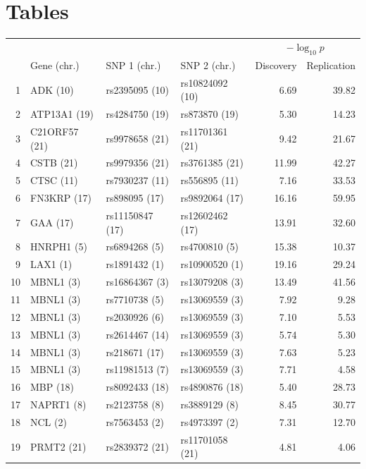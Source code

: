 \documentclass{article}
\begin{document}
\clearpage
\section{Tables}

\begin{table}[ht]
\centering
\begin{tabular}{rlllrr}
  \hline
 & & & & \multicolumn{2}{c}{$-\log_{10} p$} \\
 & Gene (chr.) & SNP 1 (chr.) & SNP 2 (chr.) & Discovery & Replication \\
  \hline
1 & ADK (10)  & rs2395095 (10)  & rs10824092 (10)  & 6.69 & 39.82 \\
  2 & ATP13A1 (19)  & rs4284750 (19)  & rs873870 (19)  & 5.30 & 14.23 \\
  3 & C21ORF57 (21)  & rs9978658 (21)  & rs11701361 (21)  & 9.42 & 21.67 \\
  4 & CSTB (21)  & rs9979356 (21)  & rs3761385 (21)  & 11.99 & 42.27 \\
  5 & CTSC (11)  & rs7930237 (11)  & rs556895 (11)  & 7.16 & 33.53 \\
  6 & FN3KRP (17)  & rs898095 (17)  & rs9892064 (17)  & 16.16 & 59.95 \\
  7 & GAA (17)  & rs11150847 (17)  & rs12602462 (17)  & 13.91 & 32.60 \\
  8 & HNRPH1 (5)  & rs6894268 (5)  & rs4700810 (5)  & 15.38 & 10.37 \\
  9 & LAX1 (1)  & rs1891432 (1)  & rs10900520 (1)  & 19.16 & 29.24 \\
  10 & MBNL1 (3)  & rs16864367 (3)  & rs13079208 (3)  & 13.49 & 41.56 \\
  11 & MBNL1 (3)  & rs7710738 (5)  & rs13069559 (3)  & 7.92 & 9.28 \\
  12 & MBNL1 (3)  & rs2030926 (6)  & rs13069559 (3)  & 7.10 & 5.53 \\
  13 & MBNL1 (3)  & rs2614467 (14)  & rs13069559 (3)  & 5.74 & 5.30 \\
  14 & MBNL1 (3)  & rs218671 (17)  & rs13069559 (3)  & 7.63 & 5.23 \\
  15 & MBNL1 (3)  & rs11981513 (7)  & rs13069559 (3)  & 7.71 & 4.58 \\
  16 & MBP (18)  & rs8092433 (18)  & rs4890876 (18)  & 5.40 & 28.73 \\
  17 & NAPRT1 (8)  & rs2123758 (8)  & rs3889129 (8)  & 8.45 & 30.77 \\
  18 & NCL (2)  & rs7563453 (2)  & rs4973397 (2)  & 7.31 & 12.70 \\
  19 & PRMT2 (21)  & rs2839372 (21)  & rs11701058 (21)  & 4.81 & 4.06 \\

\end{tabular}
\end{table}
\end{document}
